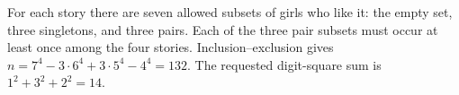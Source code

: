 For each story there are seven allowed subsets of girls who like it: the empty set, three singletons, and three pairs. Each of the three pair subsets must occur at least once among the four stories. Inclusion--exclusion gives $n=7^4-3\cdot6^4+3\cdot5^4-4^4=132$. The requested digit-square sum is $1^2+3^2+2^2=\boxed{14}$.
